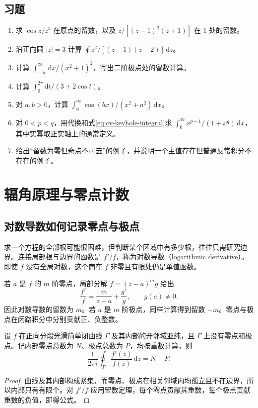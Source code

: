 \documentclass[UTF8,12pt,a4paper,fontset=fandol]{ctexbook}
\begin{document}
\section{习题}
\label{sec:cv-residue-ex}
\begin{enumerate}
 \item 求 $\cos z/z^3$ 在原点的留数，以及 $z/[(z-1)^2(z+1)]$ 在 $1$ 处的留数。
 \item 沿正向圆 $|z|=3$ 计算 $\oint z^2/[(z-1)(z-2)]\,\mathrm dz$。
 \item 计算 $\int_{-\infty}^{\infty}\mathrm dx/(x^2+1)^2$，写出二阶极点处的留数计算。
 \item 计算 $\int_0^{2\pi}\mathrm dt/(3+2\cos t)$。
 \item 对 $a,b>0$，计算 $\int_0^\infty\cos(bx)/(x^2+a^2)\,\mathrm dx$。
 \item 对 $0<p<q$，用代换和式\eqref{eq:cv-keyhole-integral}求 $\int_0^\infty x^{p-1}/(1+x^q)\,\mathrm dx$，其中实幂取正实轴上的通常定义。
 \item 给出“留数为零但奇点不可去”的例子，并说明一个主值存在但普通反常积分不存在的例子。
\end{enumerate}

\chapter{辐角原理与零点计数}
\label{chap:cv-counting}

\section{对数导数如何记录零点与极点}

求一个方程的全部根可能很困难，但判断某个区域中有多少根，往往只需研究边界。连接局部根与边界的函数是 $f'/f$，称为对数导数（logarithmic derivative）。即使 $f$ 没有全局对数，这个商在 $f$ 非零且有限处仍是单值函数。

若 $a$ 是 $f$ 的 $m$ 阶零点，局部分解 $f=(z-a)^mg$ 给出
\[
 \frac{f'}f=\frac m{z-a}+\frac{g'}g,
 \qquad g(a)\ne0.
\]
因此对数导数的留数为 $m$。若 $a$ 是 $m$ 阶极点，同样计算得到留数 $-m$。零点与极点在闭路积分中分别贡献正、负整数。

\begin{theorem}[辐角原理]
\label{thm:cv-argument}
设 $f$ 在正向分段光滑简单闭曲线 $\Gamma$ 及其内部的开邻域亚纯，且 $\Gamma$ 上没有零点和极点。记内部零点总数为 $N$、极点总数为 $P$，均按重数计算，则
\begin{equation}
 \frac1{2\pi i}\oint_\Gamma\frac{f'(z)}{f(z)}\,\mathrm dz=N-P.
 \label{eq:cv-argument}
\end{equation}
\end{theorem}
\begin{proof}
曲线及其内部构成紧集，而零点、极点在相关邻域内均孤立且不在边界，所以内部只有有限个。对 $f'/f$ 应用留数定理，每个零点贡献其重数，每个极点贡献重数的负值，即得公式。
\end{proof}
\end{document}
